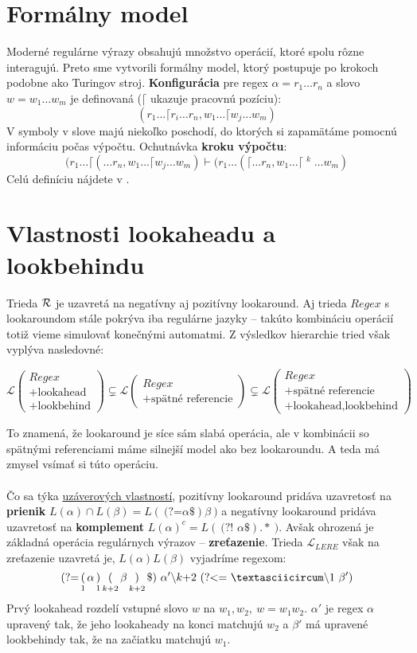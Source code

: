 \documentclass[myposter,portrait,plainboxedsections]{sciposter}
\def\R{{\cal R}} %
\def\L{\mathscr{L}} %
\def\re{Regex}
\def\lel{\mathscr{L}_{LERE}}
\def\lookahead{\text{(?=}}
\def\nlookahead{\text{(?!~}}
\def\lookbehind{\text{(?\textless =}}
\def\mysection#1{
{\color{sectionCol}\section*{\sc\bfseries #1}}}
\begin{document}
\begin{multicols*}{3}
\mysection{Formálny model} 
Moderné regulárne výrazy obsahujú množstvo operácií, ktoré spolu rôzne interagujú. Preto sme vytvorili formálny model, ktorý postupuje po krokoch podobne ako Turingov stroj. \textbf{Konfigurácia} pre regex $\alpha=r_1\dots r_n$ a slovo $w=w_1\dots w_m$ je definovaná ($\lceil$ ukazuje pracovnú pozíciu):
$$(r_1\dots \lceil r_i \dots r_n, w_1 \dots \lceil w_j \dots w_m)$$
V symboly v slove majú niekoľko poschodí, do ktorých si zapamätáme pomocnú informáciu počas výpočtu. Ochutnávka \textbf{kroku výpočtu}:
 $$\displaystyle (r_1 \dots \lceil ( \dots r_n, w_1 \dots \lceil w_j \dots w_m) \vdash (r_1 \dots (\lceil \dots r_n, w_1 \dots \lceil \mathop{w_j}^k \dots w_m)$$
Celú definíciu nájdete v \cite{mojaDip}.

\mysection{Vlastnosti lookaheadu a lookbehindu}

Trieda $\R$ je uzavretá na negatívny aj pozitívny lookaround. Aj trieda $\re$ s lookaroundom stále pokrýva iba regulárne jazyky -- takúto kombináciu operácií totiž vieme simulovať konečnými automatmi. Z výsledkov hierarchie tried však vyplýva nasledovné:

$$ \L \begin{pmatrix}
\re \\
\text{+lookahead} \\
\text{+lookbehind}
\end{pmatrix} 
\subsetneq
\L \begin{pmatrix}
\re \\
\text{+spätné referencie}
\end{pmatrix} 
\subsetneq
\L \begin{pmatrix}
\re \\
\text{+spätné referencie} \\
\text{+lookahead,lookbehind}
\end{pmatrix} 
$$

To znamená, že lookaround je síce sám slabá operácia, ale v kombinácii so spätnými referenciami máme silnejší model ako bez lookaroundu. A teda má zmysel vsímať si túto operáciu.
\\ \\ 
Čo sa týka \underline{uzáverových vlastností}, pozitívny lookaround pridáva uzavretosť na \textbf{prienik} $L(\alpha)\cap L(\beta) = L(~\lookahead\alpha\$)\beta~)$ a negatívny lookaround pridáva uzavretosť na \textbf{komplement} $L(\alpha)^c = L(~ \nlookahead \alpha \$).* ~)$. Avšak ohrozená je základná operácia regulárnych výrazov -- \textbf{zreťazenie}. Trieda $\lel$ však na zreťazenie uzavretá je, $L(\alpha)L(\beta)$ vyjadríme regexom:
$$
\lookahead \mathop(_1 \alpha \mathop)_1 \mathop(_{k+2}\beta \mathop)_{k+2} \mathdollar) ~\alpha ' \backslash k\text{+2}~ \lookbehind ~\textasciicircum\backslash 1~\beta ')
$$
Prvý lookahead rozdelí vstupné slovo $w$ na $w_1,w_2,~w=w_1w_2$. $\alpha'$ je regex $\alpha$ upravený tak, že jeho lookaheady na konci matchujú $w_2$ a $\beta'$ má upravené lookbehindy tak, že na začiatku matchujú $w_1$. \cite{mojaBak}
 

\end{multicols*}
\end{document}
